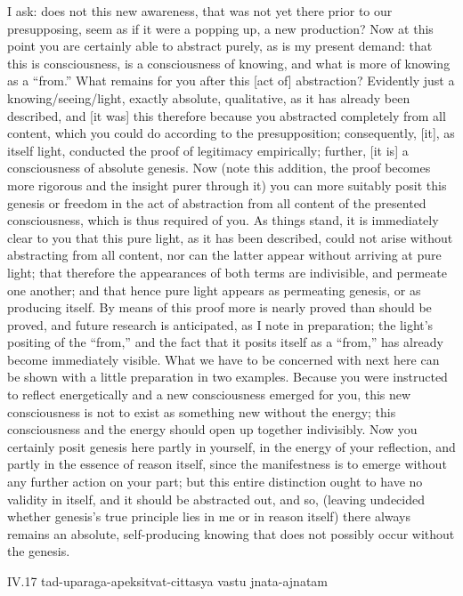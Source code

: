 I ask:
does not this new awareness,
that was not yet there prior to our presupposing,
seem as if it were a popping up, a new production?
Now at this point you are
certainly able to abstract purely,
as is my present demand:
that this is consciousness,
is a consciousness of knowing,
and what is more of knowing as a “from.”
What remains for you after this [act of] abstraction?
Evidently just a knowing/seeing/light,
exactly absolute, qualitative,
as it has already been described,
and [it was] this therefore because
you abstracted completely from all content,
which you could do according to the presupposition;
consequently, [it], as itself light, conducted
the proof of legitimacy empirically;
further, [it is] a consciousness of absolute genesis.
Now (note this addition, the proof becomes more rigorous
and the insight purer through it)
you can more suitably posit this genesis or freedom
in the act of abstraction from all content
of the presented consciousness,
which is thus required of you.
As things stand, it is immediately clear to you
that this pure light, as it has been described,
could not arise without abstracting from all content,
nor can the latter appear without arriving at pure light;
that therefore the appearances of both terms are indivisible,
and permeate one another;
and that hence pure light appears as permeating genesis,
or as producing itself.
By means of this proof more is
nearly proved than should be proved,
and future research is anticipated,
as I note in preparation;
the light's positing of the “from,”
and the fact that it posits itself as a “from,”
has already become immediately visible.
What we have to be concerned with next here
can be shown with a little preparation in two examples.
Because you were instructed to reflect energetically
and a new consciousness emerged for you,
this new consciousness is not to exist
as something new without the energy;
this consciousness and the energy should
open up together indivisibly.
Now you certainly posit genesis here
partly in yourself,
in the energy of your reflection,
and partly in the essence of reason itself,
since the manifestness is to emerge
without any further action on your part;
but this entire distinction ought to have no validity in itself,
and it should be abstracted out, and so,
(leaving undecided whether genesis's true principle
lies in me or in reason itself)
there always remains an absolute, self-producing knowing
that does not possibly occur without the genesis.

IV.17
tad-uparaga-apeksitvat-cittasya vastu jnata-ajnatam

